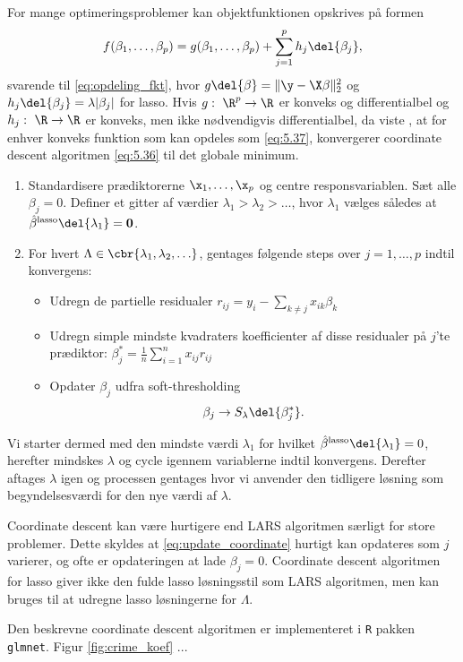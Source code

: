 For mange optimeringsproblemer kan objektfunktionen opskrives på formen
\begin{align}
f(\beta_1, \dots, \beta_p) = g(\beta_1, \dots, \beta_p) + \sum_{j = 1}^p h_j \del{\beta_j}, \label{eq:5.37}
\end{align}
svarende til \eqref{eq:opdeling_fkt}, hvor \(g \del{\beta} =\Vert \y - \X \beta \Vert_2^2\) og \(h_j \del{\beta_j} = \lambda \vert \beta_j \vert\) for lasso.
Hvis \(g: \ \R^p \rightarrow \R\) er konveks og differentialbel og $h_j: \ \R \rightarrow \R$ er konveks, men ikke nødvendigvis differentialbel, da viste \citep{Tseng_coordinate}, at for enhver konveks funktion som kan opdeles som \eqref{eq:5.37}, konvergerer coordinate descent algoritmen \eqref{eq:5.36} til det globale minimum. 
%
\begin{alg} 
\begin{enumerate}
\item Standardisere prædiktorerne \(\x_1, \ldots, \x_p\) og centre responsvariablen.
Sæt alle \(\beta_j = 0\).
Definer et gitter af værdier \(\lambda_1 > \lambda_2 > \ldots\), hvor \(\lambda_1\) vælges således at \(\hat{\beta}^\text{lasso} \del{\lambda_1} =\mathbf{0}\).
\item For hvert \(\Lambda \in \cbr{\lambda_1, \lambda_2, \ldots}\), gentages følgende steps over \(j = 1, \ldots, p\) indtil konvergens:
\begin{itemize}
\item Udregn de partielle residualer \(r_{ij} = y_i - \sum_{k \neq j} x_{ik} \beta_k\)
\item Udregn simple mindste kvadraters koefficienter af disse residualer på \(j\)'te prædiktor: \(\beta_j^* = \frac{1}{n} \sum_{i=1}^n x_{ij} r_{ij}\) 
\item Opdater \(\beta_j\) udfra soft-thresholding
\begin{align}
\beta_j \rightarrow S_\lambda \del{\beta_j^*}. \label{eq:update_coordinate}
\end{align}
\end{itemize}
\end{enumerate}
\end{alg}
%
Vi starter dermed med den mindste værdi \(\lambda_1\) for hvilket \(\hat{\beta}^\text{lasso} \del{\lambda_1} = 0\), herefter mindskes \(\lambda\) og cycle igennem variablerne indtil konvergens.
Derefter aftages \(\lambda\) igen og processen gentages hvor vi anvender den tidligere løsning som begyndelsesværdi for den nye værdi af \(\lambda\).

Coordinate descent kan være hurtigere end LARS algoritmen særligt for store problemer.
Dette skyldes at \eqref{eq:update_coordinate} hurtigt kan opdateres som \(j\) varierer, og ofte er opdateringen at lade \(\beta_j = 0\).
Coordinate descent algoritmen for lasso giver ikke den fulde lasso løsningsstil som LARS algoritmen, men kan bruges til at udregne lasso løsningerne for \(\Lambda\).

Den beskrevne coordinate descent algoritmen er implementeret i \texttt{R} pakken \texttt{glmnet}.
Figur \ref{fig:crime_koef} ...
\newpage